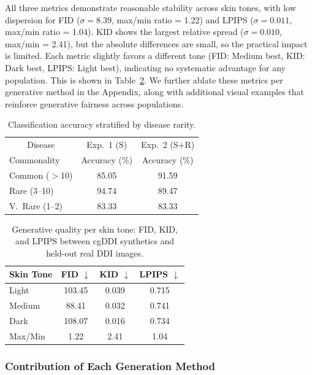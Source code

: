 \documentclass[11pt]{ucthesis}
\begin{document}
All three metrics demonstrate reasonable stability across skin tones, with low dispersion for FID ($\sigma = 8.39$, max/min ratio = 1.22) and LPIPS ($\sigma = 0.011$, max/min ratio = 1.04). KID shows the largest relative spread ($\sigma = 0.010$, max/min = 2.41), but the absolute differences are small, so the practical impact is limited. Each metric slightly favors a different tone (FID: Medium best, KID: Dark best, LPIPS: Light best), indicating no systematic advantage for any population. This is shown in Table~\ref{cgddi:tab:gen_fairness}. We further ablate these metrics per generative method in the Appendix, along with additional visual examples that reinforce generative fairness across populations.

\begin{table}[t]
\centering
\caption{Classification accuracy stratified by disease rarity.}
\label{cgddi:tab:rare_disease}
\begin{tabular}{lcc}
\toprule
\multicolumn{1}{c}{Disease} & Exp.~1 (S) & Exp.~2 (S+R) \\
Commonality & Accuracy (\%) & Accuracy (\%) \\
\midrule
Common ($>$10)  & 85.05 & 91.59 \\
Rare (3--10)    & 94.74 & 89.47 \\
V.\ Rare (1--2) & 83.33 & 83.33 \\
\bottomrule
\end{tabular}
\end{table}

\begin{table}[t]
\centering
\caption{Generative quality per skin tone: FID, KID, and LPIPS between cgDDI synthetics and held-out real DDI images.}
\label{cgddi:tab:gen_fairness}
\begin{tabular}{lccc}
\toprule
Skin Tone & FID $\downarrow$ & KID $\downarrow$ & LPIPS $\downarrow$ \\
\midrule
Light   & 103.45 & 0.039 & 0.715 \\
Medium  &  88.41 & 0.032 & 0.741 \\
Dark    & 108.07 & 0.016 & 0.734 \\
\midrule
Max/Min &   1.22 & 2.41  & 1.04  \\
\bottomrule
\end{tabular}
\end{table}

\subsubsection{Contribution of Each Generation Method}
\end{document}
